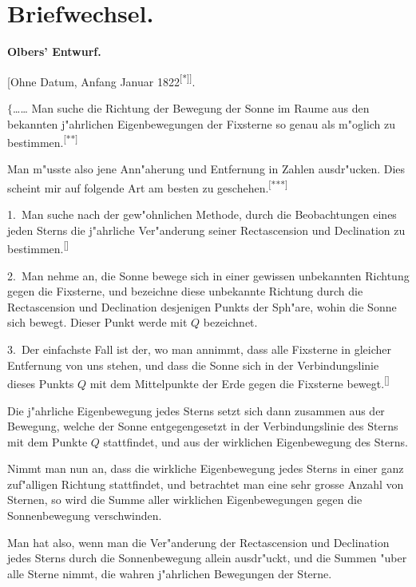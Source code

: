 \documentclass[12pt,a4paper]{article}
\theoremstyle{plain}
\theoremstyle{definition}
\theoremstyle{remark}
\begin{document}
\newpage
\section*{Briefwechsel.}

\begin{center}
\textbf{Olbers' Entwurf.}

[Ohne Datum, Anfang Januar 1822\textsuperscript{[*]]}.
\end{center}

\noindent
$\{$\ldots{}\ldots{} Man suche die Richtung der Bewegung der Sonne im Raume aus den bekannten j"ahrlichen Eigenbewegungen der Fixsterne so genau als m"oglich zu bestimmen.\textsuperscript{[**]}

Man m"usste also jene Ann"aherung und Entfernung in Zahlen ausdr"ucken. Dies scheint mir auf folgende Art am besten zu geschehen.\textsuperscript{[***]}

1.\ Man suche nach der gew"ohnlichen Methode, durch die Beobachtungen eines jeden Sterns die j"ahrliche Ver"anderung seiner Rectascension und Declination zu bestimmen.\textsuperscript{[\textdagger]}

2.\ Man nehme an, die Sonne bewege sich in einer gewissen unbekannten Richtung gegen die Fixsterne, und bezeichne diese unbekannte Richtung durch die Rectascension und Declination desjenigen Punkts der Sph"are, wohin die Sonne sich bewegt. Dieser Punkt werde mit $Q$ bezeichnet.

3.\ Der einfachste Fall ist der, wo man annimmt, dass alle Fixsterne in gleicher Entfernung von uns stehen, und dass die Sonne sich in der Verbindungslinie dieses Punkts $Q$ mit dem Mittelpunkte der Erde gegen die Fixsterne bewegt.\textsuperscript{[\textdagger\textdagger]}

Die j"ahrliche Eigenbewegung jedes Sterns setzt sich dann zusammen aus der Bewegung, welche der Sonne entgegengesetzt in der Verbindungslinie des Sterns mit dem Punkte $Q$ stattfindet, und aus der wirklichen Eigenbewegung des Sterns.

Nimmt man nun an, dass die wirkliche Eigenbewegung jedes Sterns in einer ganz zuf"alligen Richtung stattfindet, und betrachtet man eine sehr grosse Anzahl von Sternen, so wird die Summe aller wirklichen Eigenbewegungen gegen die Sonnenbewegung verschwinden.

Man hat also, wenn man die Ver"anderung der Rectascension und Declination jedes Sterns durch die Sonnenbewegung allein ausdr"uckt, und die Summen "uber alle Sterne nimmt, die wahren j"ahrlichen Bewegungen der Sterne.
\end{document}
